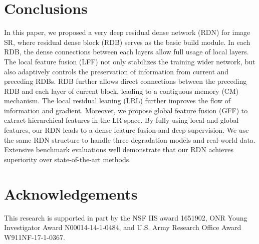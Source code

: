 \documentclass[10pt,twocolumn,letterpaper]{article}
\begin{document}
\section{Conclusions}
\vspace{-2mm}
In this paper, we proposed a very deep residual dense network (RDN) for image SR, where residual dense block (RDB) serves as the basic build module. In each RDB, the dense connections between each layers allow full usage of local layers. The local feature fusion (LFF) not only stabilizes the training wider network, but also adaptively controls the preservation of information from current and preceding RDBs. RDB further allows direct connections between the preceding RDB and each layer of current block, leading to a contiguous memory (CM) mechanism. The local residual leaning (LRL) further improves the flow of information and gradient. Moreover, we propose global feature fusion (GFF) to extract hierarchical features in the LR space. By fully using local and global features, our RDN leads to a dense feature fusion and deep supervision. We use the same RDN structure to handle three degradation models and real-world data. Extensive benchmark evaluations well demonstrate that our RDN achieves superiority over state-of-the-art methods. 
\vspace{-2mm}
\section{Acknowledgements}
\vspace{-2mm}
This research is supported in part by the NSF IIS award 1651902, ONR Young Investigator Award N00014-14-1-0484, and U.S. Army Research Office Award W911NF-17-1-0367.



{\small


}
\end{document}
